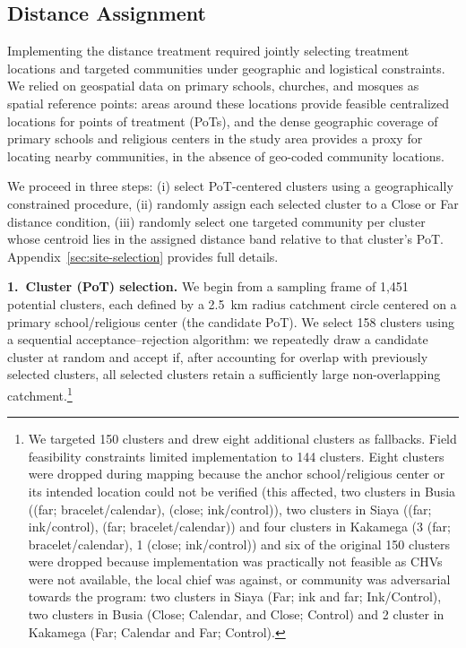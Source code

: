 \documentclass[12pt,a4paper]{article}
\begin{document}
\subsection{Distance Assignment}\label{sec:distance-treatment}

Implementing the distance treatment required jointly selecting treatment locations and targeted communities under geographic and logistical constraints. We relied on geospatial data on primary schools, churches, and mosques as spatial reference points: areas around these locations provide feasible centralized locations for points of treatment (PoTs), and the dense geographic coverage of primary schools and religious centers in the study area provides a proxy for locating nearby communities, in the absence of geo-coded community locations.

We proceed in three steps: (i) select PoT-centered clusters using a geographically constrained procedure, (ii) randomly assign each selected cluster to a Close or Far distance condition, (iii) randomly select one targeted community per cluster whose centroid lies in the assigned distance band relative to that cluster's PoT. Appendix~\ref{sec:site-selection} provides full details. %

\vspace{0.4em}
\noindent\textbf{1.\ Cluster (PoT) selection.} We begin from a sampling frame of 1{,}451 potential clusters, each defined by a 2.5~km radius catchment circle centered on a primary school/religious center (the candidate PoT). We select 158 clusters using a sequential acceptance--rejection algorithm: we repeatedly draw a candidate cluster at random and accept if, after accounting for overlap with previously selected clusters, all selected clusters retain a sufficiently large non-overlapping catchment.\footnote{We targeted 150 clusters and drew eight additional clusters as fallbacks. Field feasibility constraints limited implementation to 144 clusters. Eight clusters were dropped during mapping because the anchor school/religious center or its intended location could not be verified (this affected, two clusters in Busia ((far; bracelet/calendar), (close; ink/control)), two clusters in Siaya ((far; ink/control), (far; bracelet/calendar)) and four clusters in Kakamega (3 (far; bracelet/calendar), 1 (close; ink/control)) and six of the original 150 clusters were dropped because implementation was practically not feasible as CHVs were not available, the local chief was against, or community was adversarial towards the program: two clusters in Siaya (Far; ink and far; Ink/Control), two clusters in Busia (Close; Calendar, and Close; Control) and 2 cluster in Kakamega (Far; Calendar and Far; Control).} %
\end{document}
